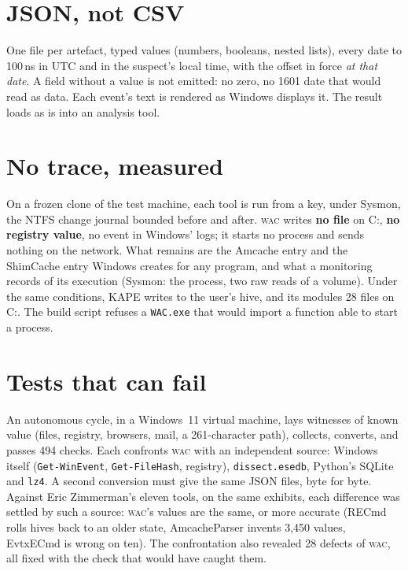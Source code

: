 \documentclass[10pt,a4paper,twocolumn]{article}
\newcommand{\wac}{\textsc{wac}}
\newcommand{\fichier}[1]{\texttt{#1}}
\begin{document}
\section{JSON, not CSV}
One file per artefact, typed values (numbers, booleans, nested lists), every
date to 100\,ns in UTC and in the suspect's local time, with the offset in force
\emph{at that date}. A field without a value is not emitted: no zero, no 1601
date that would read as data. Each event's text is rendered as Windows displays
it. The result loads as is into an analysis tool.

\section{No trace, measured}
On a frozen clone of the test machine, each tool is run from a key, under
Sysmon, the NTFS change journal bounded before and after. \wac{} writes
\textbf{no file} on C:, \textbf{no registry value}, no event in Windows' logs;
it starts no process and sends nothing on the network. What remains are the
Amcache entry and the ShimCache entry Windows creates for any program, and what
a monitoring records of its execution (Sysmon: the process, two raw reads of a
volume). Under the same conditions, KAPE writes to the user's hive, and its
modules 28 files on C:. The build script refuses a \fichier{WAC.exe} that would
import a function able to start a process.

\section{Tests that can fail}
An autonomous cycle, in a Windows~11 virtual machine, lays witnesses of known
value (files, registry, browsers, mail, a 261-character path), collects,
converts, and passes 494 checks. Each confronts \wac{} with an independent
source: Windows itself (\fichier{Get-WinEvent}, \fichier{Get-FileHash},
registry), \fichier{dissect.esedb}, Python's SQLite and \fichier{lz4}. A second
conversion must give the same JSON files, byte for byte. Against Eric
Zimmerman's eleven tools, on the same exhibits, each difference was settled by
such a source: \wac{}'s values are the same, or more accurate (RECmd rolls hives
back to an older state, AmcacheParser invents 3,450 values, EvtxECmd is wrong on
ten). The confrontation also revealed 28 defects of \wac{}, all fixed with the
check that would have caught them.
\end{document}
